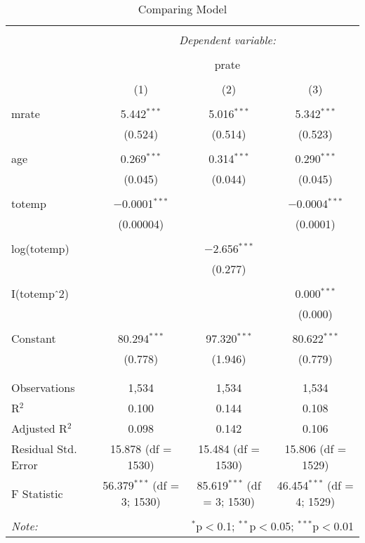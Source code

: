 
\begin{table}[!htbp] \centering 
  \caption{Comparing Model} 
  \label{} 
\begin{tabular}{@{\extracolsep{5pt}}lccc} 
\\[-1.8ex]\hline 
\hline \\[-1.8ex] 
 & \multicolumn{3}{c}{\textit{Dependent variable:}} \\ 
\cline{2-4} 
\\[-1.8ex] & \multicolumn{3}{c}{prate} \\ 
\\[-1.8ex] & (1) & (2) & (3)\\ 
\hline \\[-1.8ex] 
 mrate & 5.442$^{***}$ & 5.016$^{***}$ & 5.342$^{***}$ \\ 
  & (0.524) & (0.514) & (0.523) \\ 
  & & & \\ 
 age & 0.269$^{***}$ & 0.314$^{***}$ & 0.290$^{***}$ \\ 
  & (0.045) & (0.044) & (0.045) \\ 
  & & & \\ 
 totemp & $-$0.0001$^{***}$ &  & $-$0.0004$^{***}$ \\ 
  & (0.00004) &  & (0.0001) \\ 
  & & & \\ 
 log(totemp) &  & $-$2.656$^{***}$ &  \\ 
  &  & (0.277) &  \\ 
  & & & \\ 
 I(totemp$\hat{\mkern6mu}$2) &  &  & 0.000$^{***}$ \\ 
  &  &  & (0.000) \\ 
  & & & \\ 
 Constant & 80.294$^{***}$ & 97.320$^{***}$ & 80.622$^{***}$ \\ 
  & (0.778) & (1.946) & (0.779) \\ 
  & & & \\ 
\hline \\[-1.8ex] 
Observations & 1,534 & 1,534 & 1,534 \\ 
R$^{2}$ & 0.100 & 0.144 & 0.108 \\ 
Adjusted R$^{2}$ & 0.098 & 0.142 & 0.106 \\ 
Residual Std. Error & 15.878 (df = 1530) & 15.484 (df = 1530) & 15.806 (df = 1529) \\ 
F Statistic & 56.379$^{***}$ (df = 3; 1530) & 85.619$^{***}$ (df = 3; 1530) & 46.454$^{***}$ (df = 4; 1529) \\ 
\hline 
\hline \\[-1.8ex] 
\textit{Note:}  & \multicolumn{3}{r}{$^{*}$p$<$0.1; $^{**}$p$<$0.05; $^{***}$p$<$0.01} \\ 
\end{tabular} 
\end{table} 
